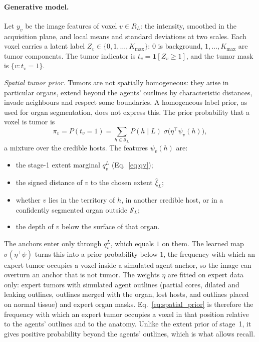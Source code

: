 \documentclass[fleqn,10pt]{olplainarticle}
\begin{document}
\paragraph{Generative model.} Let $y_v$ be the image features of voxel $v\in R_L$: the intensity, smoothed in the
acquisition plane, and local means and standard deviations at two scales. Each voxel carries a latent label
$Z_v\in\{0,1,\dots,K_{\max}\}$: $0$ is background, $1,\dots,K_{\max}$ are tumor components. The tumor indicator is
$t_v=\mathbf{1}[Z_v\ge1]$, and the tumor mask is $\{v:t_v=1\}$.

\emph{Spatial tumor prior.} Tumors are not spatially homogeneous: they arise in particular organs, extend beyond the agents'
outlines by characteristic distances, invade neighbours and respect some boundaries. A homogeneous label prior, as used
for organ segmentation, does not express this. The prior probability that a voxel is tumor is
\begin{equation}
\label{eq:spatial_prior}
\pi_v=P(t_v=1)=\sum_{h\in\mathcal{S}_L}P(h\mid L)\;\sigma\bigl(\eta^\top\psi_v(h)\bigr),
\end{equation}
a mixture over the credible hosts. The features $\psi_v(h)$ are:
\begin{itemize}
\item the stage-1 extent marginal $q^L_v$ (Eq.~\eqref{eq:qv});
\item the signed distance of $v$ to the chosen extent $\hat\xi_L$;
\item whether $v$ lies in the territory of $h$, in another credible host, or in a confidently segmented organ outside
$\mathcal{S}_L$;
\item the depth of $v$ below the surface of that organ.
\end{itemize}
The anchors enter only through $q^L_v$, which equals $1$ on them. The learned map $\sigma(\eta^\top\psi)$ turns this into a
prior probability below $1$, the frequency with which an expert tumor occupies a voxel inside a simulated agent anchor, so the
image can overturn an anchor that is not tumor. The weights $\eta$ are fitted on expert data only: expert tumors with
simulated agent outlines (partial cores, dilated and leaking outlines, outlines merged with the organ, lost hosts, and
outlines placed on normal tissue) and expert organ masks. Eq.~\eqref{eq:spatial_prior} is therefore the frequency with which
an expert tumor occupies a voxel in that position relative to the agents' outlines and to the anatomy. Unlike the extent
prior of stage~1, it gives positive probability beyond the agents' outlines, which is what allows recall.
\end{document}
